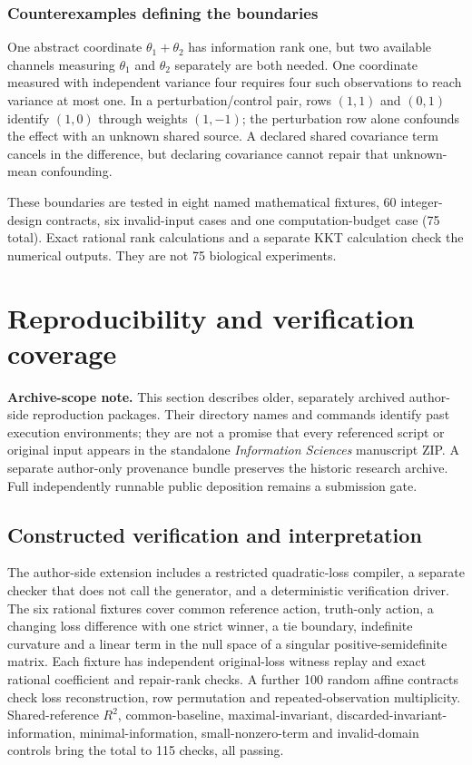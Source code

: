 \documentclass[11pt]{article}
\begin{document}
\subsubsection{Counterexamples defining the boundaries}
One abstract coordinate $\theta_1+\theta_2$ has information rank one, but two available channels measuring $\theta_1$ and $\theta_2$ separately are both needed. One coordinate measured with independent variance four requires four such observations to reach variance at most one. In a perturbation/control pair, rows $(1,1)$ and $(0,1)$ identify $(1,0)$ through weights $(1,-1)$; the perturbation row alone confounds the effect with an unknown shared source. A declared shared covariance term cancels in the difference, but declaring covariance cannot repair that unknown-mean confounding.

These boundaries are tested in eight named mathematical fixtures, 60 integer-design contracts, six invalid-input cases and one computation-budget case (75 total). Exact rational rank calculations and a separate KKT calculation check the numerical outputs. They are not 75 biological experiments.




\section{Reproducibility and verification coverage}
\noindent\textbf{Archive-scope note.} This section describes older, separately archived author-side reproduction packages. Their directory names and commands identify past execution environments; they are not a promise that every referenced script or original input appears in the standalone \emph{Information Sciences} manuscript ZIP. A separate author-only provenance bundle preserves the historic research archive. Full independently runnable public deposition remains a submission gate.



\subsection{Constructed verification and interpretation}
The author-side extension includes a restricted quadratic-loss compiler, a separate checker that does not call the generator, and a deterministic verification driver. The six rational fixtures cover common reference action, truth-only action, a changing loss difference with one strict winner, a tie boundary, indefinite curvature and a linear term in the null space of a singular positive-semidefinite matrix. Each fixture has independent original-loss witness replay and exact rational coefficient and repair-rank checks. A further 100 random affine contracts check loss reconstruction, row permutation and repeated-observation multiplicity. Shared-reference $R^2$, common-baseline, maximal-invariant, discarded-invariant-information, minimal-information, small-nonzero-term and invalid-domain controls bring the total to 115 checks, all passing.
\end{document}

